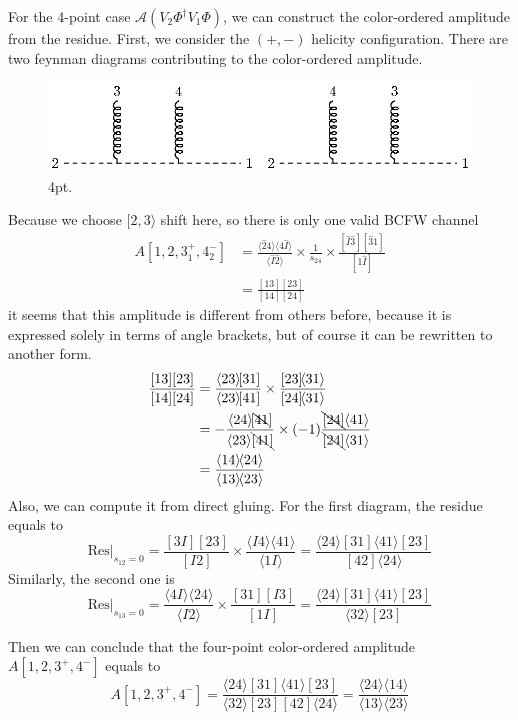 \documentclass[12pt]{article}
\newcommand{\mdavg}[2]{\langle #1 \rangle\!\langle #2 \rangle}
\newcommand{\avg}[1]{\langle #1 \rangle}
\newcommand{\cbrak}[2]{\avg{#1}\![#2]}
\newcommand{\acbrak}[2]{[#1]\!\avg{#2}}
\begin{document}
For the 4-point case $\mathcal{A}(V_2\Phi^\dagger V_1 \Phi )$, we can construct the color-ordered amplitude from the residue. First, we consider the $(+,-)$ helicity
configuration. There are two feynman diagrams contributing to the color-ordered amplitude.\\
\begin{figure}[htbp]
    \centering
    \includegraphics{4pt.eps}
    \caption{4pt.}
    \label{1}
\end{figure}

Because we choose $[2,3\rangle$ shift here, so there is only one valid BCFW channel
\begin{align*}
    A[1,2,3_1^+,4_2^-]&=\frac{\mdavg{\hat{2}4}{4\hat{I}}}{\avg{\hat{I}\hat{2}}}\times\frac{1}{s_{24}}\times\frac{[\hat{I}\hat{3}][\hat{3}1]}{[1\hat{I}]}\\
    &=\frac{[13][23]}{[14][24]}
\end{align*}
it seems that this amplitude is different from others before, because it is expressed solely in terms of angle brackets, but of course it can be rewritten to another form.
\begin{align*}
    \frac{[13][23]}{[14][24]}&=\frac{\cbrak{23}{31}}{\cbrak{23}{41}}\times \frac{\acbrak{23}{31}}{\acbrak{24}{31}}\\
    &=-\frac{\cbrak{24}{\bcancel{41}}}{\avg{23}\bcancel{[41]}}\times(-1)\frac{\bcancel{[24]}\avg{41}}{\bcancel{[24]}\avg{31}}\\
    &=\frac{\mdavg{14}{24}}{\mdavg{13}{23}}
\end{align*}
Also, we can compute it from direct gluing. For the first diagram, the residue equals to
\begin{equation*}
    \mathrm{Res}|_{s_{12}=0}=\frac{[3 I ] [23]}{[I2]}\times \frac{\avg{I4}\avg{41}}{\avg{1I}}=\frac{\avg{24}[31]\avg{41}[23]}{[42]\avg{24}}
\end{equation*}
Similarly, the second one is
\begin{equation*}
    \mathrm{Res}|_{s_{13}=0}=\frac{\avg{4I}\avg{24}}{\avg{I2}}\times \frac{[31] [I3]}{[1I]}=\frac{\avg{24}[31]\avg{41}[23]}{\avg{32}[23]}
\end{equation*}

Then we can conclude that the four-point color-ordered amplitude $A[1,2,3^+,4^-]$ equals to
\begin{equation*}
    A[1,2,3^+,4^-]=\frac{\avg{24}[31]\avg{41}[23]}{\avg{32}[23][42]\avg{24}}=\frac{\avg{24}\avg{14}}{\avg{13}\avg{23}}
\end{equation*}
\end{document}
